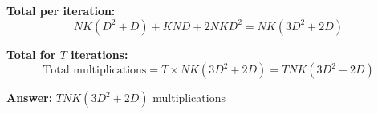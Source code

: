 \documentclass[11pt]{article}
\begin{document}
\textbf{Total per iteration:}
\[
NK(D^2 + D) + KND + 2NKD^2 = NK(3D^2 + 2D)
\]

\textbf{Total for $T$ iterations:}
\[
\text{Total multiplications} = T \times NK(3D^2 + 2D) = TNK(3D^2 + 2D)
\]

\textbf{Answer:} $TNK(3D^2 + 2D)$ multiplications
\end{document}
